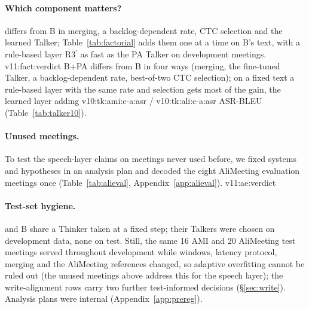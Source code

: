 \ifFactorial
\paragraph{Which component matters?}
\sys{} differs from B in merging, a backlog-dependent rate, CTC selection and the learned Talker;
Table~\ref{tab:factorial} adds them one at a time on B's text, with a rule-based layer R3$^\prime$ as fast as the
PA Talker on development meetings. \num{v11:fact:verdict}
\else
B+PA differs from B in four ways (merging, the fine-tuned Talker, a backlog-dependent rate, best-of-two CTC
selection); on a fixed text a rule-based layer with the same rate and selection gets most of the gain, the learned layer
adding \num{v10:tk:ami:c-a:asr} / \num{v10:tk:ali:c-a:asr} ASR-BLEU (Table~\ref{tab:talker10}).
\fi

\ifAliEval
\paragraph{Unused meetings.}
\label{sec:res-alieval}
To test the speech-layer claims on meetings never used before, we fixed systems and hypotheses in an analysis plan
and decoded the eight AliMeeting evaluation meetings once (Table~\ref{tab:alieval}, Appendix~\ref{app:alieval}).
\num{v11:ae:verdict}
\fi

\paragraph{Test-set hygiene.}
\label{sec:res-hygiene}
\sys{} and B share a Thinker taken at a fixed step; their Talkers were chosen on development data, none on test. Still, the
same 16 AMI and 20 AliMeeting test meetings served throughout development while windows, latency protocol, merging and
the AliMeeting references changed, so adaptive overfitting cannot be ruled out\ifAliEval{} (the unused meetings above
address this for the speech layer)\fi; the write-alignment rows carry two further test-informed decisions
(\S\ref{sec:write}). Analysis plans were internal (Appendix~\ref{app:prereg}).
